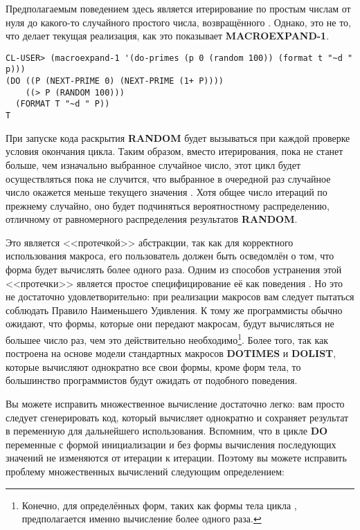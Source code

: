 Предполагаемым поведением здесь является итерирование по простым числам от нуля до
какого-то случайного простого числа, возвращённого . Однако, это не то,
что делает текущая реализация, как это показывает \textbf{MACROEXPAND-1}.

\begin{lstlisting}
CL-USER> (macroexpand-1 '(do-primes (p 0 (random 100)) (format t "~d " p)))
(DO ((P (NEXT-PRIME 0) (NEXT-PRIME (1+ P))))
    ((> P (RANDOM 100)))
  (FORMAT T "~d " P))
T
\end{lstlisting}

При запуске кода раскрытия \textbf{RANDOM} будет вызываться при каждой проверке условия
окончания цикла. Таким образом, вместо итерирования, пока  не станет больше, чем
изначально выбранное случайное число, этот цикл будет осуществляться пока не случится, что
выбранное в очередной раз случайное число окажется меньше текущего значения . Хотя
общее число итераций по прежнему случайно, оно будет подчиняться вероятностному
распределению, отличному от равномерного распределения результатов \textbf{RANDOM}.

Это является <<протечкой>> абстракции, так как для корректного использования макроса, его
пользователь должен быть осведомлён о том, что форма  будет вычислять более
одного раза. Одним из способов устранения этой <<протечки>> является простое
специфицирование её как поведения . Но это не достаточно
удовлетворительно: при реализации макросов вам следует пытаться соблюдать Правило
Наименьшего Удивления. К тому же программисты обычно ожидают, что формы, которые они
передают макросам, будут вычисляться не большее число раз, чем это действительно
необходимо\footnote{Конечно, для определённых форм, таких как формы тела цикла
  , предполагается именно вычисление более одного раза.}. Более того, так
как  построена на основе модели стандартных макросов \textbf{DOTIMES} и
\textbf{DOLIST}, которые вычисляют однократно все свои формы, кроме форм тела, то
большинство программистов будут ожидать от  подобного поведения.

Вы можете исправить множественное вычисление достаточно легко: вам просто следует
сгенерировать код, который вычисляет  однократно и сохраняет результат в
переменную для дальнейшего использования. Вспомним, что в цикле \textbf{DO} переменные с
формой инициализации и без формы вычисления последующих значений не изменяются от итерации
к итерации. Поэтому вы можете исправить проблему множественных вычислений следующим
определением:

